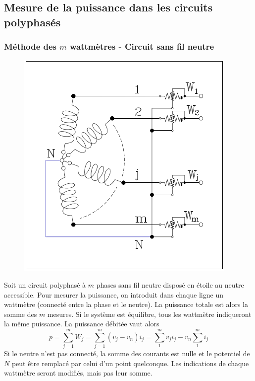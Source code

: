 	\subsection{Mesure de la puissance dans les circuits polyphasés}
		\subsubsection{Méthode des $m$ wattmètres - Circuit sans fil neutre}
		\begin{figure}
		\vspace{-11mm}
		\includegraphics[scale=0.4]{ch1/image11.png}
		\end{figure}
		Soit un circuit polyphasé à $m$ phases sans fil neutre disposé en 
		étoile au neutre accessible. Pour mesurer la puissance, on introduit 
		dans chaque ligne un wattmètre (connecté entre la phase et le neutre). 
		La puissance totale est alors la somme des $m$ mesures. Si le système 
		est équilibre, tous les wattmètre indiqueront la même puissance. La 
		puissance débitée vaut alors
		\begin{equation}
		p = \sum_{j=1}^m W_j = \sum_{j=1}^m (v_j-v_n)i_j = \sum_1^m v_ji_j -
		v_n\sum_1^m i_j
		\end{equation}
		Si le neutre n'est pas connecté, la somme des courants est nulle et le 
		potentiel de $N$ peut être remplacé par celui d'un point quelconque. Les 
		indications de chaque wattmètre seront modifiés, mais pas leur somme.
		
